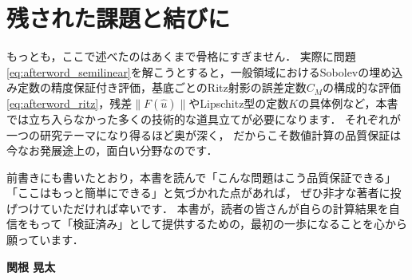 \section*{残された課題と結びに}

もっとも，ここで述べたのはあくまで骨格にすぎません．
実際に問題\eqref{eq:afterword_semilinear}を解こうとすると，一般領域におけるSobolevの埋め込み定数の精度保証付き評価，基底ごとのRitz射影の誤差定数$C_M$の構成的な評価\eqref{eq:afterword_ritz}，残差$\| F(\hat{u}) \|$やLipschitz型の定数$K$の具体例など，本書では立ち入らなかった多くの技術的な道具立てが必要になります．
それぞれが一つの研究テーマになり得るほど奥が深く，
だからこそ数値計算の品質保証は今なお発展途上の，面白い分野なのです．

前書きにも書いたとおり，本書を読んで「こんな問題はこう品質保証できる」「ここはもっと簡単にできる」と気づかれた点があれば，
ぜひ非才な著者に投げつけていただければ幸いです．
本書が，読者の皆さんが自らの計算結果を自信をもって「検証済み」として提供するための，最初の一歩になることを心から願っています．

\vspace{1cm}

\begin{flushright}
\textbf{関根 晃太}
\end{flushright}
